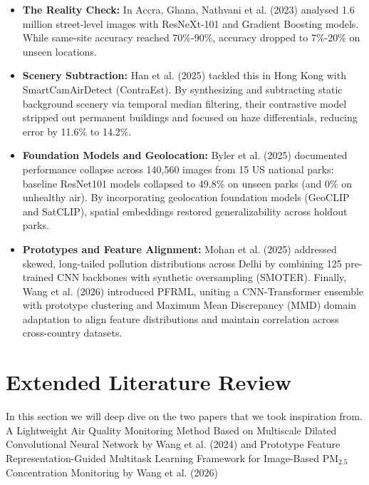\documentclass[conference]{IEEEtran}
\newcommand{\pmtwofive}{PM$_{2.5}$}
\begin{document}
\begin{itemize}
  \item \textbf{The Reality Check:} In Accra, Ghana, Nathvani et al.
        (2023)\cite{nathvaniHereNowEvaluating2023} analysed 1.6 million
        street-level images with ResNeXt-101 and Gradient Boosting models. While
        same-site accuracy reached 70\%-90\%, accuracy dropped to 7\%-20\% on
        unseen locations.
  \item \textbf{Scenery Subtraction:} Han et al.
        (2025)\cite{hanSmartCamAirDetectContrastiveApproach2025} tackled this in
        Hong Kong with SmartCamAirDetect (ContraEst). By synthesizing and
        subtracting static background scenery via temporal median filtering,
        their contrastive model stripped out permanent buildings and focused on
        haze differentials, reducing error by 11.6\% to 14.2\%.
  \item \textbf{Foundation Models and Geolocation:} Byler et al.
        (2025)\cite{bylerLocationGeneralizabilityImageBased2025} documented
        performance collapse across 140,560 images from 15 US national parks:
        baseline ResNet101 models collapsed to 49.8\% on unseen parks (and 0\%
        on unhealthy air). By incorporating geolocation foundation models
        (GeoCLIP and SatCLIP), spatial embeddings restored generalizability
        across holdout parks.
  \item \textbf{Prototypes and Feature Alignment:} Mohan et al.
        (2025)\cite{mohanDeepLearningBasedPM252025} addressed skewed,
        long-tailed pollution distributions across Delhi by combining 125
        pre-trained CNN backbones with synthetic oversampling (SMOTER). Finally,
        Wang et al. (2026)\cite{wangPrototypeFeatureRepresentationGuided2026}
        introduced PFRML, uniting a CNN-Transformer ensemble with prototype
        clustering and Maximum Mean Discrepancy (MMD) domain adaptation to align
        feature distributions and maintain correlation across cross-country
        datasets.
\end{itemize}

\section{Extended Literature Review}

In this section we will deep dive on the two papers that we took inspiration
from. A Lightweight Air Quality Monitoring Method Based on Multiscale Dilated
Convolutional Neural Network by Wang et al.
(2024)\cite{wangLightweightAirQuality2024} and Prototype Feature
Representation-Guided Multitask Learning Framework for Image-Based \pmtwofive{}
Concentration Monitoring by Wang et al. (2026)
\cite{wangPrototypeFeatureRepresentationGuided2026}
\end{document}
